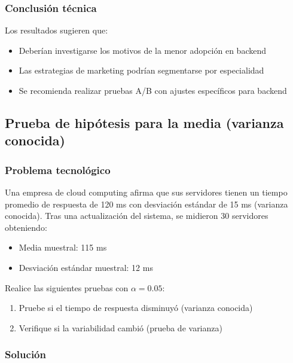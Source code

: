 \subsubsection*{Conclusión técnica}
Los resultados sugieren que:
\begin{itemize}
\item Deberían investigarse los motivos de la menor adopción en backend
\item Las estrategias de marketing podrían segmentarse por especialidad
\item Se recomienda realizar pruebas A/B con ajustes específicos para backend
\end{itemize}

\newpage

\subsection{Prueba de hipótesis para la media (varianza conocida)}

\subsubsection*{Problema tecnológico}
Una empresa de cloud computing afirma que sus servidores tienen un tiempo promedio de respuesta de 120 ms con desviación estándar de 15 ms (varianza conocida). Tras una actualización del sistema, se midieron 30 servidores obteniendo:
\begin{itemize}
\item Media muestral: 115 ms
\item Desviación estándar muestral: 12 ms
\end{itemize}

Realice las siguientes pruebas con $\alpha = 0.05$:
\begin{enumerate}
\item Pruebe si el tiempo de respuesta disminuyó (varianza conocida)
\item Verifique si la variabilidad cambió (prueba de varianza)
\end{enumerate}

\subsubsection*{Solución}

